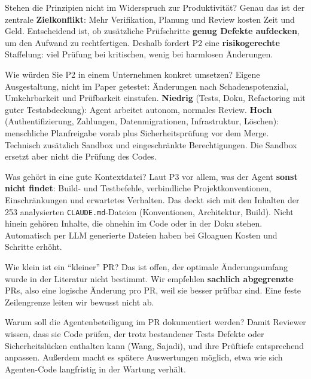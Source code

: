 \documentclass[12pt,a4paper]{article}
\begin{document}
\begin{qa}{Stehen die Prinzipien nicht im Widerspruch zur Produktivität?}
Genau das ist der zentrale \textbf{Zielkonflikt}: Mehr Verifikation, Planung und Review kosten Zeit und Geld. Entscheidend ist, ob zusätzliche Prüfschritte \textbf{genug Defekte aufdecken}, um den Aufwand zu rechtfertigen. Deshalb fordert P2 eine \textbf{risikogerechte} Staffelung: viel Prüfung bei kritischen, wenig bei harmlosen Änderungen.
\end{qa}

\begin{qa}{Wie würden Sie P2 in einem Unternehmen konkret umsetzen?}
Eigene Ausgestaltung, nicht im Paper getestet: Änderungen nach Schadenspotenzial, Umkehrbarkeit und Prüfbarkeit einstufen. \textbf{Niedrig} (Tests, Doku, Refactoring mit guter Testabdeckung): Agent arbeitet autonom, normales Review. \textbf{Hoch} (Authentifizierung, Zahlungen, Datenmigrationen, Infrastruktur, Löschen): menschliche Planfreigabe vorab plus Sicherheitsprüfung vor dem Merge. Technisch zusätzlich Sandbox und eingeschränkte Berechtigungen. Die Sandbox ersetzt aber nicht die Prüfung des Codes.
\end{qa}

\begin{qa}{Was gehört in eine gute Kontextdatei?}
Laut P3 vor allem, was der Agent \textbf{sonst nicht findet}: Build- und Testbefehle, verbindliche Projektkonventionen, Einschränkungen und erwartetes Verhalten. Das deckt sich mit den Inhalten der 253 analysierten \texttt{CLAUDE.md}-Dateien (Konventionen, Architektur, Build). Nicht hinein gehören Inhalte, die ohnehin im Code oder in der Doku stehen. Automatisch per LLM generierte Dateien haben bei Gloaguen Kosten und Schritte erhöht.
\end{qa}

\begin{qa}{Wie klein ist ein \enquote{kleiner} PR?}
Das ist offen, der optimale Änderungsumfang wurde in der Literatur nicht bestimmt. Wir empfehlen \textbf{sachlich abgegrenzte} PRs, also eine logische Änderung pro PR, weil sie besser prüfbar sind. Eine feste Zeilengrenze leiten wir bewusst nicht ab.
\end{qa}

\begin{qa}{Warum soll die Agentenbeteiligung im PR dokumentiert werden?}
Damit Reviewer wissen, dass sie Code prüfen, der trotz bestandener Tests Defekte oder Sicherheitslücken enthalten kann (Wang, Sajadi), und ihre Prüftiefe entsprechend anpassen. Außerdem macht es spätere Auswertungen möglich, etwa wie sich Agenten-Code langfristig in der Wartung verhält.
\end{qa}
\end{document}
